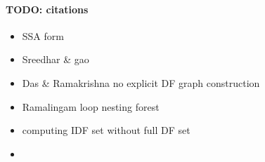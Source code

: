 {\paragraph{TODO: citations}
\begin{itemize}
  \item SSA form \cite{cfr}
  \item Sreedhar \& gao \cite{sreedhar_popl}
  \item Das \& Ramakrishna no explicit DF graph construction  \cite{das}
  \item Ramalingam loop nesting forest  \cite{rama}
  \item computing IDF set without full DF set \cite{sreedhar_popl,sreedharthesis}
  \item \cite{bilardi} 
\end{itemize}
}
